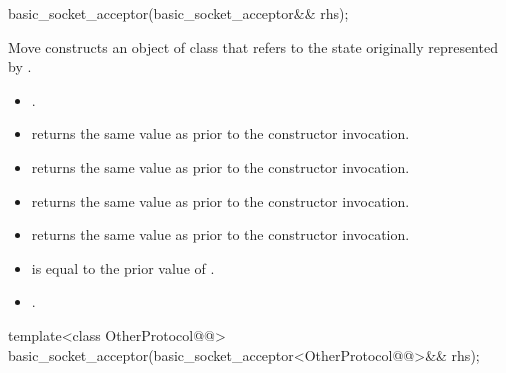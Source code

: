 \begin{itemdescr}
\addedpnum
{}

\addedpnum
{}
\end{itemdescr}

\begin{itemdecl}
basic_socket_acceptor(basic_socket_acceptor&& rhs);
\end{itemdecl}

\begin{itemdescr}
\pnum
\effects Move constructs an object of class  that refers to the state originally represented by .

\pnum
\postconditions
\begin{itemize}
\item
{}.
\item
{} returns the same value as  prior to the constructor invocation.
\item
{} returns the same value as  prior to the constructor invocation.
\item
{} returns the same value as  prior to the constructor invocation.
\item
{} returns the same value as  prior to the constructor invocation.
\item
{} is equal to the prior value of .
\item
{}.
\end{itemize}
\end{itemdescr}

\begin{itemdecl}
template<class OtherProtocol@@>
  basic_socket_acceptor(basic_socket_acceptor<OtherProtocol@@>&& rhs);
\end{itemdecl}

